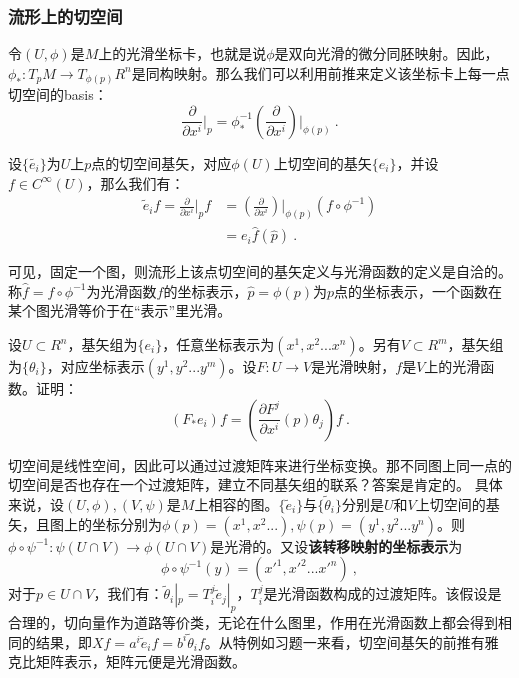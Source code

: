 \subsubsection{流形上的切空间}
令$(U,\phi)$是$M$上的光滑坐标卡，也就是说$\phi$是双向光滑的微分同胚映射。因此，$\phi_*:T_p M\rightarrow T_{\phi(p)}R^n$是同构映射。那么我们可以利用前推来定义该坐标卡上每一点切空间的basis：
\begin{equation}
\frac{\partial}{\partial x^i}\bigg|_p=\phi^{-1}_* (\frac{\partial}{\partial x^i})\bigg|_{\phi(p)}~.
\end{equation}

设$\{\widetilde{e_i}\}$为$U$上$p$点的切空间基矢，对应$\phi (U)$上切空间的基矢$\{{e_i}\}$，并设$f\in C^{\infty}(U)$，那么我们有：
\begin{equation}
\begin{aligned}
\widetilde e_i f=\frac{\partial}{\partial x^i}\bigg|_p f&= (\frac{\partial}{\partial x^i})\bigg|_{\phi(p)}(f\circ \phi^{-1})\\
&=e_i\hat f(\hat p)~.
\end{aligned}
\end{equation}

可见，固定一个图，则流形上该点切空间的基矢定义与光滑函数的定义是自洽的。称$\hat f=f\circ \phi^{-1}$为光滑函数$f$的坐标表示，$\hat p=\phi (p)$为$p$点的坐标表示，一个函数在某个图光滑等价于在“表示”里光滑。
\begin{exercise}{}
设$U\subset R^n$，基矢组为$\{e_i\}$，任意坐标表示为$(x^1,x^2...x^n)$。另有$V\subset R^m$，基矢组为$\{ \theta_i\}$，对应坐标表示$(y^1,y^2...y^m)$。设$F:U\rightarrow V$是光滑映射，$f$是$V$上的光滑函数。证明：
\begin{equation}
(F_* e_i)f=(\frac{\partial F^j}{\partial x^i}(p)\theta_j)f~.
\end{equation}

\end{exercise}
切空间是线性空间，因此可以通过过渡矩阵来进行坐标变换。那不同图上同一点的切空间是否也存在一个过渡矩阵，建立不同基矢组的联系？答案是肯定的。
具体来说，设$(U,\phi),(V,\psi)$是$M$上相容的图。$\{\widetilde e_i\}$与$\{\widetilde \theta_i\}$分别是$U$和$V$上切空间的基矢，且图上的坐标分别为$\phi(p)=(x^1,x^2...),\psi(p)=(y^1,y^2...y^n)$。则$\phi\circ\psi^{-1}:\psi(U\cap V)\rightarrow\phi(U\cap V)$是光滑的。又设\textbf{该转移映射的坐标表示}为
\begin{equation}
\phi\circ \psi^{-1}(y)=(x'^1,x'^2...x'^n)~,
\end{equation}
对于$p\in U\cap V$，我们有：$\widetilde\theta_i|_p=T^j_i \widetilde e_j|_p$，$T^j_i$是光滑函数构成的过渡矩阵。该假设是合理的，切向量作为道路等价类，无论在什么图里，作用在光滑函数上都会得到相同的结果，即$Xf=a^i\widetilde e_if=b^i\widetilde \theta_i f$。从特例如习题一来看，切空间基矢的前推有雅克比矩阵表示，矩阵元便是光滑函数。

